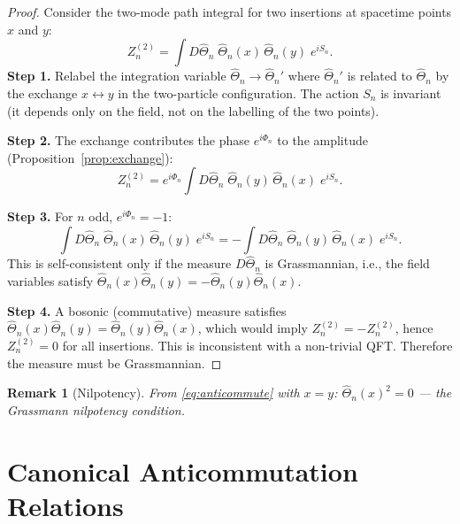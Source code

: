 \documentclass[11pt,a4paper]{article}
\newtheorem{remark}{Remark}
\begin{document}
\begin{proof}
  Consider the two-mode path integral for two insertions at spacetime points
  $x$ and $y$:
  \begin{equation}
    Z_n^{(2)}
    = \int D\hat\Theta_n\;
      \hat\Theta_n(x)\,\hat\Theta_n(y)\;
      e^{iS_n}.
  \end{equation}
  \medskip
  \noindent\textbf{Step 1.}
  Relabel the integration variable $\hat\Theta_n\to\hat\Theta_n'$ where
  $\hat\Theta_n'$ is related to $\hat\Theta_n$ by the exchange
  $x\leftrightarrow y$ in the two-particle configuration.  The action
  $S_n$ is invariant (it depends only on the field, not on the labelling
  of the two points).
  
  \medskip
  \noindent\textbf{Step 2.}
  The exchange contributes the phase $e^{i\Phi_n}$ to the amplitude
  (Proposition~\ref{prop:exchange}):
  \begin{equation}
    Z_n^{(2)}
    = e^{i\Phi_n}\int D\hat\Theta_n\;
      \hat\Theta_n(y)\,\hat\Theta_n(x)\;
      e^{iS_n}.
  \end{equation}
  
  \medskip
  \noindent\textbf{Step 3.}
  For $n$ odd, $e^{i\Phi_n}=-1$:
  \begin{equation}
    \int D\hat\Theta_n\;
    \hat\Theta_n(x)\,\hat\Theta_n(y)\;
    e^{iS_n}
    =
    -\int D\hat\Theta_n\;
    \hat\Theta_n(y)\,\hat\Theta_n(x)\;
    e^{iS_n}.
  \end{equation}
  This is self-consistent only if the measure $D\hat\Theta_n$ is
  Grassmannian, i.e., the field variables satisfy
  $\hat\Theta_n(x)\hat\Theta_n(y) = -\hat\Theta_n(y)\hat\Theta_n(x)$.
  
  \medskip
  \noindent\textbf{Step 4.}
  A bosonic (commutative) measure satisfies
  $\hat\Theta_n(x)\hat\Theta_n(y) = \hat\Theta_n(y)\hat\Theta_n(x)$,
  which would imply $Z_n^{(2)} = -Z_n^{(2)}$, hence $Z_n^{(2)} = 0$
  for all insertions.  This is inconsistent with a non-trivial QFT.
  Therefore the measure must be Grassmannian.
\end{proof}

\begin{remark}[Nilpotency]
  From \eqref{eq:anticommute} with $x=y$:
  $\hat\Theta_n(x)^2 = 0$ — the Grassmann nilpotency condition.
\end{remark}

\section{Canonical Anticommutation Relations}
\label{sec:car}
\end{document}
